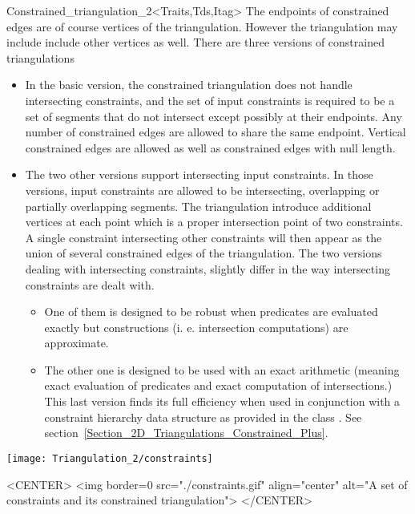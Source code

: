 \begin{ccRefClass}{Constrained_triangulation_2<Traits,Tds,Itag>}
The endpoints of constrained edges are of course vertices of the
triangulation. However the triangulation may include
include other vertices as well.
There are three versions of  constrained triangulations
\begin{itemize}
\item
In the basic version, the constrained triangulation 
does not handle intersecting constraints, and the set of input 
constraints is required to be a set of segments that do not intersect
except possibly at their endpoints. Any number of constrained edges
are allowed to share the same endpoint.  Vertical constrained edges
are allowed as well as 
constrained edges with null length.
\item
The two other versions support intersecting input constraints.
In those versions, input constraints are allowed to be
intersecting, overlapping or partially
overlapping segments.
The triangulation introduce  additional  vertices at each point which
is a proper intersection point of  two 
constraints. A single constraint intersecting other
constraints will then appear as the union of several 
constrained edges of  the triangulation.
The two versions dealing with intersecting constraints, slightly differ
in the way intersecting constraints are dealt with.
\begin{itemize}
\item  One of them is
designed to be robust when predicates are evaluated exactly but
constructions (i. e.  intersection computations) are
approximate.
\item
The other one is designed to be used 
with an exact arithmetic (meaning exact
evaluation of predicates and exact computation of intersections.)
This last version finds its full efficiency  when used in conjunction
with a constraint hierarchy data structure 
as provided in the class
. See
section~\ref{Section_2D_Triangulations_Constrained_Plus}.
\end{itemize}
\end{itemize}



\begin{ccTexOnly}
\begin{center} \texttt{[image: Triangulation\_2/constraints]} \end{center}
\end{ccTexOnly}

\begin{ccHtmlOnly}
<CENTER>
<img border=0 src="./constraints.gif" align="center" alt="A set of
constraints and its constrained triangulation">
</CENTER>
\end{ccHtmlOnly}


\end{ccRefClass}
